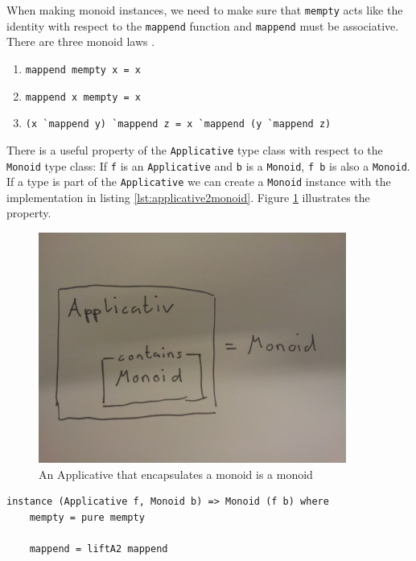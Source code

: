 When making monoid instances, we need to make sure that \verb|mempty| acts like the identity with respect to the \verb|mappend| function and \verb|mappend| must be associative. There are three monoid laws \cite{monoid}.

\begin{enumerate}
\item \verb|mappend mempty x = x|
\item \verb|mappend x mempty = x|
\item \verb|(x `mappend y) `mappend z = x `mappend (y `mappend z)|
\end{enumerate}

There is a useful property of the \verb|Applicative| type class with respect to the \verb|Monoid| type class: If \verb|f| is an \verb|Applicative| and \verb|b| is a \verb|Monoid|, \verb|f b| is also a \verb|Monoid|. If a type is part of the \verb|Applicative| we can create a \verb|Monoid| instance with the implementation in listing \ref{lst:applicative2monoid}. Figure \ref{fig:applicative_monoid} illustrates the property.

\begin{figure}
  \centering
     \includegraphics[width=0.9\textwidth]{applicative_monoid}
  \caption{An Applicative that encapsulates a monoid is a monoid}
  \label{fig:applicative_monoid}
\end{figure}

\begin{program}
\begin{verbatim}
instance (Applicative f, Monoid b) => Monoid (f b) where
    mempty = pure mempty

    mappend = liftA2 mappend
\end{verbatim}
\label{lst:applicative2monoid}
\caption{Applicative property}
\end{program}

